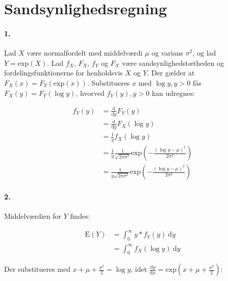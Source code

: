 \section{Sandsynlighedsregning}
\newcommand{\diff}{\mathrm{d}}

\paragraph{1.} Lad $X$ være normalfordelt med middelværdi $\mu$ og
varians $\sigma^2$, og lad $Y=\mathrm{exp}(X)$. Lad $f_X$, $F_X$, $f_Y$ og $F_X$ være
sandsynlighedstætheden og fordelingsfunktionerne for henholdsvis $X$ og $Y$. Der
gælder at $F_X(x) =
F_Y(\mathrm{exp}(x))$. Substitueres $x$ med $\log y, y > 0$
fås $F_X(y) = F_Y(\log y)$, hvorved $f_Y(y), y > 0$ kan udregnes:

\begin{align*}
f_Y(y) &= \frac{\diff}{\diff y} F_Y(y) \\
&= \frac{\diff}{\diff y} F_X(\log y) \\
&= \frac{1}{y} f_X(\log y) \\
&= \frac{1}{y} \frac{1}{\sqrt{2\pi\sigma^2}}\mathrm{exp}\left( -\frac{(\log y - \mu)^2}{2\sigma^2} \right) \\ 
&= \frac{1}{y\sqrt{2\pi\sigma^2}}\mathrm{exp}\left( -\frac{(\log y - \mu)^2}{2\sigma^2} \right) 
\end{align*}


\paragraph{2.} Middelværdien for $Y$ findes:

\begin{align*}
\mathrm{E}(Y) &= \int_0^\infty y*f_Y(y)\ \diff y \\
&= \int_0^\infty f_X(\log y)\ \diff y 
\end{align*}

Der substitueres med $x + \mu + \frac{\sigma^2}{2} = \log y$, idet $\frac{\diff
y}{\diff x} = \mathrm{exp}(x + \mu + \frac{\sigma^2}{2})$:

